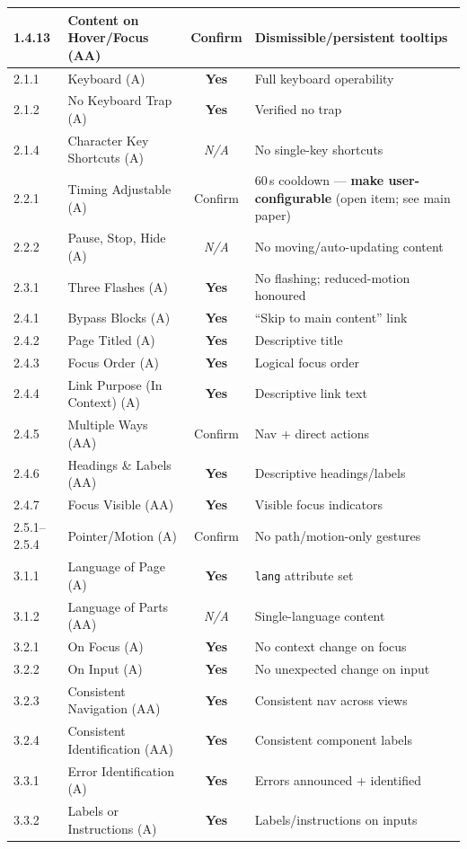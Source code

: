 \documentclass[10pt]{article}
\newcommand{\yes}{\textcolor{green!55!black}{\textbf{Yes}}}
\newcommand{\na}{\textit{N/A}}
\newcommand{\conf}{\textcolor{orange!80!black}{Confirm}}
\begin{document}
\begin{center}
\begin{longtable}{|l|p{5.3cm}|c|p{4.2cm}|}
1.4.13 & Content on Hover/Focus (AA) & \conf & Dismissible/persistent tooltips\\\hline
2.1.1 & Keyboard (A) & \yes & Full keyboard operability\\\hline
2.1.2 & No Keyboard Trap (A) & \yes & Verified no trap\\\hline
2.1.4 & Character Key Shortcuts (A) & \na & No single-key shortcuts\\\hline
2.2.1 & Timing Adjustable (A) & \conf & 60\,s cooldown --- \textbf{make user-configurable} (open item; see main paper)\\\hline
2.2.2 & Pause, Stop, Hide (A) & \na & No moving/auto-updating content\\\hline
2.3.1 & Three Flashes (A) & \yes & No flashing; reduced-motion honoured\\\hline
2.4.1 & Bypass Blocks (A) & \yes & ``Skip to main content'' link\\\hline
2.4.2 & Page Titled (A) & \yes & Descriptive title\\\hline
2.4.3 & Focus Order (A) & \yes & Logical focus order\\\hline
2.4.4 & Link Purpose (In Context) (A) & \yes & Descriptive link text\\\hline
2.4.5 & Multiple Ways (AA) & \conf & Nav + direct actions\\\hline
2.4.6 & Headings \& Labels (AA) & \yes & Descriptive headings/labels\\\hline
2.4.7 & Focus Visible (AA) & \yes & Visible focus indicators\\\hline
2.5.1--2.5.4 & Pointer/Motion (A) & \conf & No path/motion-only gestures\\\hline
3.1.1 & Language of Page (A) & \yes & \texttt{lang} attribute set\\\hline
3.1.2 & Language of Parts (AA) & \na & Single-language content\\\hline
3.2.1 & On Focus (A) & \yes & No context change on focus\\\hline
3.2.2 & On Input (A) & \yes & No unexpected change on input\\\hline
3.2.3 & Consistent Navigation (AA) & \yes & Consistent nav across views\\\hline
3.2.4 & Consistent Identification (AA) & \yes & Consistent component labels\\\hline
3.3.1 & Error Identification (A) & \yes & Errors announced + identified\\\hline
3.3.2 & Labels or Instructions (A) & \yes & Labels/instructions on inputs\\\hline

\end{longtable}
\end{center}
\end{document}
